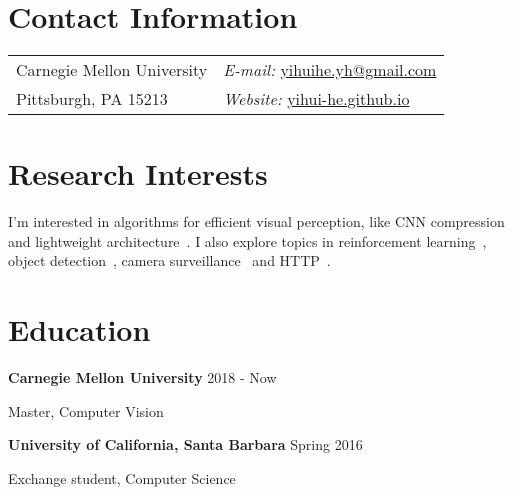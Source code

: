 \documentclass[margin,line]{res}
\newenvironment{list1}{
  \begin{list}{\ding{113}}{%
      \setlength{\itemsep}{0in}
      \setlength{\parsep}{0in} \setlength{\parskip}{0in}
      \setlength{\topsep}{0in} \setlength{\partopsep}{0in} 
      \setlength{\leftmargin}{0.17in}}}{\end{list}}
\begin{document}
\nocite{*}


\begin{resume}
\section{\sc Contact Information}
\vspace{.05in}
\begin{tabular}{@{}p{2in}p{4in}}        
Carnegie Mellon University & {\it E-mail:}  
\href{mailto:yihuihe.yh@gmail.com}{yihuihe.yh@gmail.com}\\       
Pittsburgh, PA 15213  & {\it Website:} 
\href{http://yihui-he.github.io/}{yihui-he.github.io} \\     
\end{tabular}


\section{\sc Research Interests}
I'm interested in algorithms for efficient visual perception, like CNN compression~\cite{He_2017_ICCV,adc,tpami} and lightweight architecture~\cite{liang2017single}.
I also explore topics in reinforcement learning~\cite{adc}, object detection~\cite{He_2017_ICCV}, camera surveillance~\cite{ma2017vehicle} and HTTP~\cite{pid}.
\section{\sc Education}
{\bf Carnegie Mellon University} \hfill {2018 - Now}\\
\vspace*{-.1in}
\begin{list1}
\item[] Master, Computer Vision
\end{list1}

{\bf University of California, Santa Barbara} \hfill {Spring 2016}\\
\vspace*{-.1in}
\begin{list1}
\item[] Exchange student, Computer Science %
\end{list1}


\end{resume}
\end{document}
